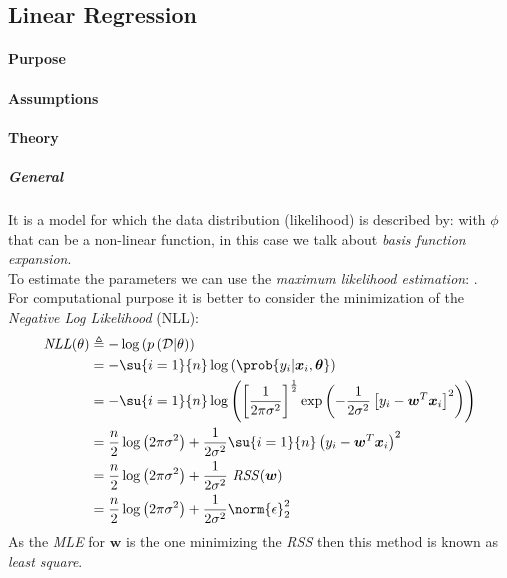 \subsection{Linear Regression}
\paragraph{Purpose}
\paragraph{Assumptions}
\paragraph{Theory}
\subparagraph{General}
It is a model for which the data distribution (likelihood) is described 
by:
with $\phi$ that can be a non-linear function, in this case we talk about
\emph{basis function expansion}.\\
To estimate the parameters we can use the \emph{maximum likelihood 
estimation}: .\\
For computational purpose it is better to consider the minimization of 
the \textit{Negative Log Likelihood} (NLL):
\begin{align*}
    \text{\emph{NLL}}(\theta) &\triangleq -\log\left(p\left(\mathcal{D}|
    \theta\right)\right)\\
                              &=-\su{i=1}{n}\log\left(\prob{y_{i}|
                                      \bm{x}_{i},\bm{\theta}}\right)\\
                              &=-\su{i=1}{n}\log\left(\left[\dfrac{1}{
                              2\pi\sigma^{2}}\right]^{\frac{1}{2}}\exp
                              \left(-\dfrac{1}{2\sigma^{2}}\left[y_{i}
                                      - \bm{w}^{T} \bm{x}_{i}\right]^{2}
                              \right)\right)\\
                              &= \dfrac{n}{2}\log\left(2\pi\sigma^{2}
                              \right) + \dfrac{1}{2\sigma^{2}}\su{i=1}{
                              n}\left(y_{i} - \bm{w}^{T}\bm{x}_{i}
                              \right)^{2}\\
                              &= \dfrac{n}{2}\log\left(2\pi\sigma^{2}
                              \right) + \dfrac{1}{2\sigma^{2}}\text{
                              \emph{RSS}}(\bm{w})\\
                              &= \dfrac{n}{2}\log\left(2\pi\sigma^{2}
                          \right) + \dfrac{1}{2\sigma^{2}}\norm{\epsilon
                          }_{2}^{2}
\end{align*}
As the \emph{MLE} for $\bm{w}$ is the one minimizing the \emph{RSS} then
this method is known as \emph{least square}.

